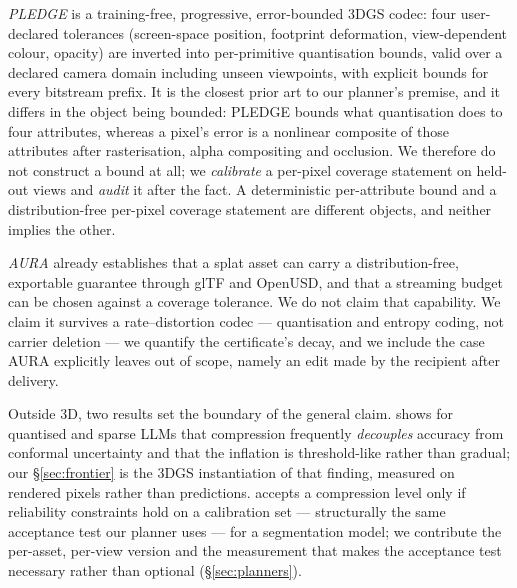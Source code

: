 \documentclass[preprint,number,3p]{elsarticle}
\begin{document}
\emph{PLEDGE} \cite{pledge} is a training-free, progressive, error-bounded 3DGS codec: four user-declared tolerances
(screen-space position, footprint deformation, view-dependent colour, opacity) are inverted into per-primitive
quantisation bounds, valid over a declared camera domain including unseen viewpoints, with explicit bounds for every
bitstream prefix. It is the closest prior art to our planner's premise, and it differs in the object being bounded:
PLEDGE bounds what quantisation does to four attributes, whereas a pixel's error is a nonlinear composite of those
attributes after rasterisation, alpha compositing and occlusion. We therefore do not construct a bound at all; we
\emph{calibrate} a per-pixel coverage statement on held-out views and \emph{audit} it after the fact. A deterministic
per-attribute bound and a distribution-free per-pixel coverage statement are different objects, and neither implies
the other.

\emph{AURA} \cite{aura} already establishes that a splat asset can carry a distribution-free, exportable guarantee
through glTF and OpenUSD, and that a streaming budget can be chosen against a coverage tolerance. We do not claim that
capability. We claim it survives a rate--distortion codec --- quantisation and entropy coding, not carrier deletion
--- we quantify the certificate's decay, and we include the case AURA explicitly leaves out of scope, namely an edit
made by the recipient after delivery.

Outside 3D, two results set the boundary of the general claim. \cite{compuncertainty} shows for quantised and sparse
LLMs that compression frequently \emph{decouples} accuracy from conformal uncertainty and that the inflation is
threshold-like rather than gradual; our \S\ref{sec:frontier} is the 3DGS instantiation of that finding, measured on
rendered pixels rather than predictions. \cite{sgavmp} accepts a compression level only if reliability constraints hold
on a calibration set --- structurally the same acceptance test our planner uses --- for a segmentation model; we
contribute the per-asset, per-view version and the measurement that makes the acceptance test necessary rather than
optional (\S\ref{sec:planners}).
\end{document}
